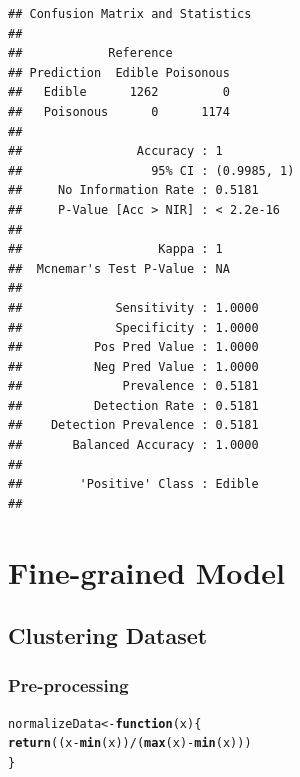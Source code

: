 \documentclass[10pt  ,usenames, dvipsnames]{article}\usepackage[]{graphicx}\usepackage[]{color}
\makeatletter
\newcommand{\hlopt}[1]{\textcolor[rgb]{0,0,0}{#1}}%
\newcommand{\hlstd}[1]{\textcolor[rgb]{0.345,0.345,0.345}{#1}}%
\newcommand{\hlkwa}[1]{\textcolor[rgb]{0.161,0.373,0.58}{\textbf{#1}}}%
\newcommand{\hlkwb}[1]{\textcolor[rgb]{0.69,0.353,0.396}{#1}}%
\newcommand{\hlkwc}[1]{\textcolor[rgb]{0.333,0.667,0.333}{#1}}%
\newcommand{\hlkwd}[1]{\textcolor[rgb]{0.737,0.353,0.396}{\textbf{#1}}}%
\newenvironment{kframe}{%
 \def\at@end@of@kframe{}%
 \ifinner\ifhmode%
  \def\at@end@of@kframe{\end{minipage}}%
  \begin{minipage}{\columnwidth}%
 \fi\fi%
 \def\FrameCommand##1{\hskip\@totalleftmargin \hskip-\fboxsep
 \colorbox{shadecolor}{##1}\hskip-\fboxsep
     \hskip-\linewidth \hskip-\@totalleftmargin \hskip\columnwidth}%
 \MakeFramed {\advance\hsize-\width
   \@totalleftmargin\z@ \linewidth\hsize
   \@setminipage}}%
 {\par\unskip\endMakeFramed%
 \at@end@of@kframe}
\newenvironment{knitrout}{}{} %
\makeatother
\begin{document}
\begin{knitrout}
\color{fgcolor}\begin{kframe}
\begin{verbatim}
## Confusion Matrix and Statistics
## 
##            Reference
## Prediction  Edible Poisonous
##   Edible      1262         0
##   Poisonous      0      1174
##                                      
##                Accuracy : 1          
##                  95% CI : (0.9985, 1)
##     No Information Rate : 0.5181     
##     P-Value [Acc > NIR] : < 2.2e-16  
##                                      
##                   Kappa : 1          
##  Mcnemar's Test P-Value : NA         
##                                      
##             Sensitivity : 1.0000     
##             Specificity : 1.0000     
##          Pos Pred Value : 1.0000     
##          Neg Pred Value : 1.0000     
##              Prevalence : 0.5181     
##          Detection Rate : 0.5181     
##    Detection Prevalence : 0.5181     
##       Balanced Accuracy : 1.0000     
##                                      
##        'Positive' Class : Edible     
## 
\end{verbatim}
\end{kframe}
\end{knitrout}


\clearpage



\section{Fine-grained Model}


\subsection{Clustering Dataset}

\subsubsection{Pre-processing}

\begin{knitrout}
\color{fgcolor}\begin{kframe}
\begin{alltt}
\hlstd{normalizeData} \hlkwb{<-} \hlkwa{function} \hlstd{(}\hlkwc{x} \hlstd{) \{}
\hlkwd{return} \hlstd{( (x}\hlopt{-}\hlkwd{min}\hlstd{(x) )} \hlopt{/} \hlstd{(} \hlkwd{max}\hlstd{(x)}\hlopt{-} \hlkwd{min}\hlstd{(x) ))}
\hlstd{\}}
\end{alltt}
\end{kframe}
\end{knitrout}
\end{document}
